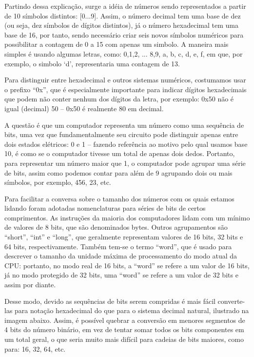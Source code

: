 Partindo dessa explicação, surge a idéia de números sendo representados a partir de 10 símbolos distintos: [0...9]. Assim, o número decimal tem uma base de dez (ou seja, dez símbolos de dígitos distintos), já o número hexadecimal tem uma base de 16, por tanto, sendo necessário criar seis novos símbolos numéricos para possibilitar a contagem de 0 a 15 com apenas um simbolo. A maneira mais simples é usando algumas letras, como: 0,1,2, ... 8,9, a, b, c, d, e, f, em que, por exemplo, o simbolo `d', representaria uma contagem de 13.

Para distinguir entre hexadecimal e outros sistemas numéricos, costumamos usar o prefixo ``0x'', que é especialmente importante para indicar dígitos hexadecimais que podem não conter nenhum dos dígitos da letra, por exemplo: 0x50 não é igual (decimal) 50 – 0x50 é realmente 80 em decimal.

A questão é que um computador representa um número como uma sequência de bits, uma vez que fundamentalmente seu circuito pode distinguir apenas entre dois estados elétricos: 0 e 1 – fazendo referência ao motivo pelo qual usamos base 10, é como se o computador tivesse um total de apenas dois dedos. Portanto, para representar um número maior que 1, o computador pode agrupar uma série de bits, assim como podemos contar para além de 9 agrupando dois ou mais símbolos, por exemplo, 456, 23, etc.

Para facilitar a conversa sobre o tamanho dos números com os quais estamos lidando foram adotadas nomenclaturas para séries de bits de certos comprimentos. As instruções da maioria dos computadores lidam com um mínimo de valores de 8 bits, que são denominados bytes. Outros agrupamentos são ``short'', ``int'' e ``long'', que geralmente representam valores de 16 bits, 32 bits e 64 bits, respectivamente. Também tem-se o termo ``word'', que é usado para descrever o tamanho da unidade máxima de processamento do modo atual da CPU: portanto, no modo real de 16 bits, a ``word'' se refere a um valor de 16 bits, já no modo protegido de 32 bits, uma ``word'' se refere a um valor de 32 bits e assim por diante.

Desse modo, devido as sequências de bits serem compridas é mais fácil converte-las para notação hexadecimal do que para o sistema decimal natural, ilustrado na imagem abaixo. Assim, é possível quebrar a conversão em menores segmentos de 4 bits do número binário, em vez de tentar somar todos os bits componentes em um total geral, o que seria muito mais difícil para cadeias de bits maiores, como para: 16, 32, 64, etc. 

